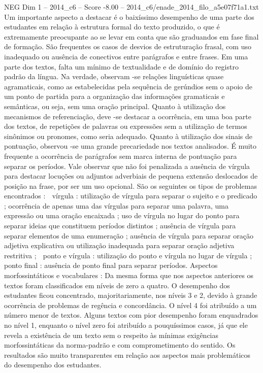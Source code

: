 \begin{textsample}{NEG Dim 1 – 2014\_c6 – Score -8.00 – 2014\_c6/enade\_2014\_filo\_a5e07f71a1.txt}
Um importante aspecto a destacar é o baixíssimo desempenho de uma parte dos estudantes em relação à estrutura formal do texto produzido, o que é extremamente preocupante ao se levar em conta que são graduandos em fase final de formação.
São frequentes os casos de desvios de estruturação frasal, com uso inadequado ou ausência de conectivos entre parágrafos e entre frases.
Em uma parte dos textos, falta um mínimo de textualidade e de domínio do registro padrão da língua.
Na verdade, observam -se relações linguísticas quase agramaticais, como as estabelecidas pela sequência de gerúndios sem o apoio de um ponto de partida para a organização das informações gramaticais e semânticas, ou seja, sem uma oração principal.
Quanto à utilização dos mecanismos de referenciação, deve -se destacar a ocorrência, em uma boa parte dos textos, de repetições de palavras ou expressões sem a utilização de termos sinônimos ou pronomes, como seria adequado.
Quanto à utilização dos sinais de pontuação, observou -se uma grande precariedade nos textos analisados.
É muito frequente a ocorrência de parágrafos sem marca interna de pontuação para separar os períodos.
Vale observar que não foi penalizada a ausência de vírgula para destacar locuções ou adjuntos adverbiais de pequena extensão deslocados de posição na frase, por ser um uso opcional.
São os seguintes os tipos de problemas encontrados :  vírgula : utilização de vírgula para separar o sujeito e o predicado ; ocorrência de apenas uma das vírgulas para separar uma palavra, uma expressão ou uma oração encaixada ; uso de vírgula no lugar do ponto para separar ideias que constituem períodos distintos ; ausência de vírgula para separar elementos de uma enumeração ; ausência de vírgula para separar oração adjetiva explicativa ou utilização inadequada para separar oração adjetiva restritiva ;  ponto e vírgula : utilização do ponto e vírgula no lugar de vírgula ;  ponto final : ausência de ponto final para separar períodos.
Aspectos morfossintáticos e vocabulares : Da mesma forma que nos aspectos anteriores os textos foram classificados em níveis de zero a quatro.
O desempenho dos estudantes ficou concentrado, majoritariamente, nos níveis 3 e 2, devido à grande ocorrência de problemas de regência e concordância.
O nível 4 foi atribuído a um número menor de textos.
Alguns textos com pior desempenho foram enquadrados no nível 1, enquanto o nível zero foi atribuído a pouquíssimos casos, já que ele revela a existência de um texto sem o respeito às mínimas exigências morfossintáticas da norma-padrão e com comprometimento do sentido.
Os resultados são muito transparentes em relação aos aspectos mais problemáticos do desempenho dos estudantes.

\end{textsample}
